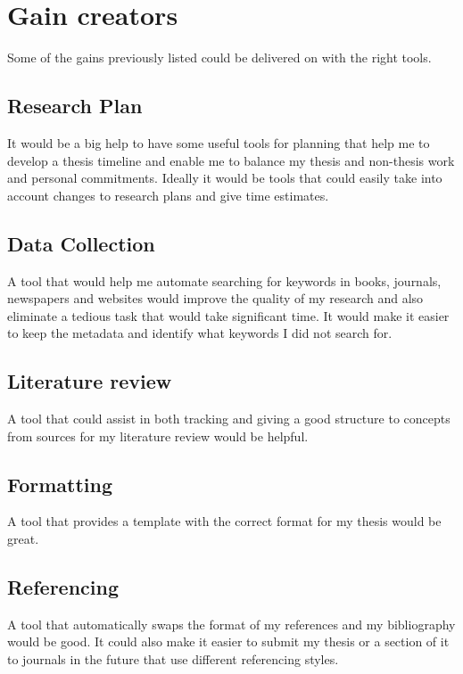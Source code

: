 \documentclass{article}
\begin{document}
\section*{Gain creators}
Some of the gains previously listed could be delivered on with the right tools.
\subsection*{Research Plan}
It would be a big help to have some useful tools for planning that help me to develop a thesis timeline and enable me to balance my thesis and non-thesis work and personal commitments. Ideally it would be tools that could easily take into account changes to research plans and give time estimates. \par

\subsection*{Data Collection}

A tool that would help me automate searching for keywords in books, journals, newspapers and websites would improve the quality of my research and also eliminate a tedious task that would take significant time. It would make it easier to keep the metadata and identify what keywords I did not search for.

\subsection*{Literature review}
A tool that could assist in both tracking and giving a good structure to concepts from sources for my literature review would be helpful.

\subsection*{Formatting}
A tool that provides a template with the correct format for my thesis would be great.

\subsection*{Referencing}

A tool that automatically swaps the format of my references and my bibliography would be good. It could also make it easier to submit my thesis or a section of it to journals in the future that use different referencing styles.
\end{document}

